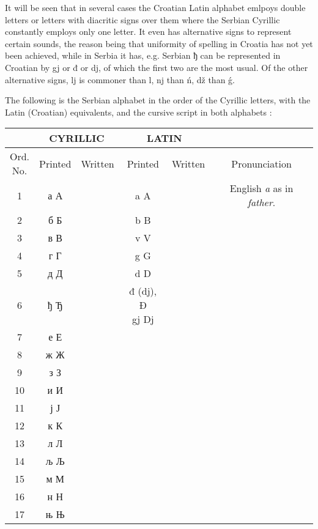         It will be seen that in several cases the Croatian Latin alphabet
        emlpoys double letters or letters with diacritic signs over them where
        the Serbian Cyrillic constantly employs only one letter.
        It even has alternative signs to represent certain sounds, the reason
        being that uniformity of spelling in Croatia has not yet been achieved,
        while in Serbia it has, e.g. Serbian ђ can be represented
        in Croatian by gj or đ or dj, of which the first two are the most
        usual. Of the other alternative signs, lj is commoner than l, nj than
        ń, dž than ǵ.
        
        The following is the Serbian alphabet in the order of the Cyrillic
        letters, with the Latin (Croatian) equivalents, and the cursive script
        in both alphabets :
        \newpage
        
        \hspace*{-1.75cm}\begin{tabularx}{\paperwidth}{c|c|c|c|c|c}
            {} & \multicolumn{2}{c|}{\textbf{\Large CYRILLIC}} & \multicolumn{2}{c|}{\textbf{\Large LATIN}} &\\
            \hline
            \shortstack{Ord.\\ No.} & Printed & Written & Printed & Written & Pronunciation\\
            \hline
            1 & {\LARGE а А} &  & a A & & English \emph{a} as in \emph{father}.\\
            2 & {\LARGE б Б} &  & {\LARGE b B}    & & \\
            3 & {\LARGE в В} &  &  {\LARGE v V}   & & \\
            4 & {\LARGE г Г} &  &  {\LARGE g G}   & & \\
            5 & {\LARGE д Д} &  & {\LARGE d D}    & & \\
            6 & {\LARGE ђ Ђ} &  & \shortstack{\LARGE đ (dj), Đ\\\LARGE gj \hfill Dj}    & & \\
            7 & {\LARGE е Е} &  & {\LARGE }    & & \\
            8 & {\LARGE ж Ж} &  & {\LARGE }    & & \\
            9 & {\LARGE з З} &  & {\LARGE }    & & \\
            10 & {\LARGE и И} &  & {\LARGE }    & & \\
            11 & {\LARGE ј Ј} &  & {\LARGE }    & & \\
            12 & {\LARGE к К} &  & {\LARGE }    & & \\
            13 & {\LARGE л Л} &  & {\LARGE }    & & \\
            14 & {\LARGE љ Љ} &  & {\LARGE }    & & \\
            15 & {\LARGE м М} &  & {\LARGE }    & & \\
            16 & {\LARGE н Н} &  & {\LARGE }    & & \\
            17 & {\LARGE њ Њ} &  & {\LARGE }    & & \\
        \end{tabularx}
        

